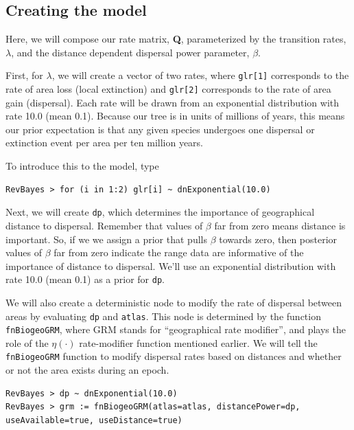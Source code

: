 \documentclass[11pt]{article}
\begin{document}
\subsection{Creating the model}

Here, we will compose our rate matrix, {\bf Q}, parameterized by the transition rates, $\lambda$, and the distance dependent dispersal power parameter, $\beta$.

First, for $\lambda$, we will create a vector of two rates, where {\tt glr[1]} corresponds to the rate of area loss (local extinction) and {\tt glr[2]} corresponds to the rate of area gain (dispersal).
Each rate will be drawn from an exponential distribution with rate 10.0 (mean 0.1).
Because our tree is in units of millions of years, this means our prior expectation is that any given species undergoes one dispersal or extinction event per area per ten million years.

To introduce this to the model, type
\begin{snugshade}
\begin{lstlisting}
RevBayes > for (i in 1:2) glr[i] ~ dnExponential(10.0)
\end{lstlisting}
\end{snugshade}

Next, we will create {\tt dp}, which determines the importance of geographical distance to dispersal.
Remember that values of $\beta$ far from zero means distance is important.
So, if we we assign a prior that pulls $\beta$ towards zero, then posterior values of $\beta$ far from zero indicate the range data are informative of the importance of distance to dispersal.
We'll use an exponential distribution with rate 10.0 (mean 0.1) as a prior for {\tt dp}.

We will also create a deterministic node to modify the rate of dispersal between areas by evaluating {\tt dp} and {\tt atlas}.
This node is determined by the function {\tt fnBiogeoGRM}, where GRM stands for ``geographical rate modifier'', and plays the role of the $\eta(\cdot)$ rate-modifier function mentioned earlier.
We will tell the {\tt fnBiogeoGRM} function to modify dispersal rates based on distances and whether or not the area exists during an epoch.

\begin{snugshade}
\begin{lstlisting}
RevBayes > dp ~ dnExponential(10.0)
RevBayes > grm := fnBiogeoGRM(atlas=atlas, distancePower=dp, useAvailable=true, useDistance=true)
\end{lstlisting}
\end{snugshade}
\end{document}
